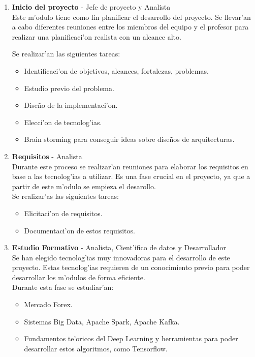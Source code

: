 \begin{enumerate}
\item \textbf{Inicio del proyecto} - Jefe de proyecto y Analista\\
Este m'odulo tiene como fin planificar el desarrollo del proyecto. Se llevar'an a cabo diferentes reuniones entre los miembros del equipo y el profesor para realizar una planificaci'on realista con un alcance alto.\\

\clearpage

Se realizar'an las siguientes tareas:
\begin{itemize}
\item Identificaci'on de objetivos, alcances, fortalezas, problemas.
\item Estudio previo del problema.
\item Diseño de la implementaci'on.
\item Elecci'on de tecnolog'ias.
\item Brain storming para conseguir ideas sobre diseños de arquitecturas.
\end{itemize}


\item \textbf{Requisitos} - Analista\\
Durante este proceso se realizar'an reuniones para elaborar los requisitos en base a las tecnolog'ias a utilizar. Es una fase crucial en el proyecto, ya que a partir de este m'odulo se empieza el desarollo.\\
Se realizar'as las siguientes tareas:
\begin{itemize}
\item Elicitaci'on de requisitos.
\item Documentaci'on de estos requisitos.
\end{itemize}


\item \textbf{Estudio Formativo }- Analista, Cient'ifico de datos y Desarrollador\\
Se han elegido tecnolog'ias muy innovadoras para el desarrollo de este proyecto. Estas tecnolog'ias requieren de un conocimiento previo para poder desarrollar los m'odulos de forma eficiente.\\
Durante esta fase se estudiar'an:
\begin{itemize}
\item Mercado Forex.
\item Sistemas Big Data, Apache Spark, Apache Kafka.
\item Fundamentos te'oricos del Deep Learning y herramientas para poder desarrollar estos algoritmos, como Tensorflow.
\end{itemize}



\end{enumerate}
